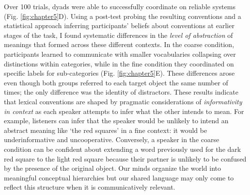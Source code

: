 \documentclass[11pt]{article}
\begin{document}
Over 100 trials, dyads were able to successfully coordinate on reliable systems (Fig. \ref{fig:chapter5}D).
Using a post-test probing the resulting conventions and a statistical approach inferring participants' beliefs about conventions at earlier stages of the task, I found systematic differences in the \emph{level of abstraction} of meanings that formed across these different contexts. 
In the coarse condition, participants learned to communicate with smaller vocabularies collapsing over distinctions within categories, while in the fine condition they coordinated on specific labels for sub-categories (Fig. \ref{fig:chapter5}E).
These differences arose even though both groups referred to each target object the same number of times; the only difference was the identity of distractors.
These results indicate that lexical conventions are shaped by pragmatic considerations of \textit{informativity in context} as each speaker attempts to infer what the other intends to mean.
For example, listeners can infer that the speaker would be unlikely to intend an abstract meaning like `the red squares' in a fine context: it would be underinformative and uncooperative. 
Conversely, a speaker in the coarse condition can be confident about extending a word previously used for the dark red square to the light red square because their partner is unlikely to be confused by the presence of the original object. 
Our minds organize the world into meaningful conceptual hierarchies but our shared language may only come to reflect this structure when it is communicatively relevant. 


\end{document}
